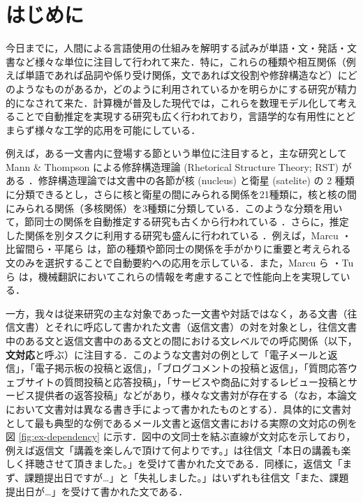 \documentclass[japanese]{jnlp_1.4}
\begin{document}
\maketitle


\section{はじめに}

今日までに，人間による言語使用の仕組みを解明する試みが単語・文・発話・文書など様々な単位に注目して行われて来た．特に，これらの種類や相互関係（例えば単語であれば品詞や係り受け関係，文であれば文役割や修辞構造など）にどのようなものがあるか，どのように利用されているかを明らかにする研究が精力的になされて来た．計算機が普及した現代では，これらを数理モデル化して考えることで自動推定を実現する研究も広く行われており，言語学的な有用性にとどまらず様々な工学的応用を可能にしている．

例えば，ある一文書内に登場する節という単位に注目すると，主な研究として Mann \& Thompson による修辞構造理論 (Rhetorical Structure Theory; RST) がある \cite{Mann1987,Mann1992}．修辞構造理論では文書中の各節が核 (nucleus) と衛星 (satelite) の 2 種類に分類できるとし，さらに核と衛星の間にみられる関係を21種類に，核と核の間にみられる関係（多核関係）を3種類に分類している．このような分類を用いて，節同士の関係を自動推定する研究も古くから行われている \cite{Marcu1997a,田村直良:1998-01-10}．さらに，推定した関係を別タスクに利用する研究も盛んに行われている \cite{Marcu99discoursetrees,比留間正樹:1999-07-10,Marcu2000,平尾:2013,tu-zhou-zong:2013:Short}．例えば，Marcu \citeyear{Marcu99discoursetrees}・比留間ら\citeyear{比留間正樹:1999-07-10}・平尾ら \citeyear{平尾:2013} は，節の種類や節同士の関係を手がかりに重要と考えられる文のみを選択することで自動要約への応用を示している．また，Marcu ら \citeyear{Marcu2000}・Tu ら \citeyear{tu-zhou-zong:2013:Short} は，機械翻訳においてこれらの情報を考慮することで性能向上を実現している．

一方，我々は従来研究の主な対象であった一文書や対話ではなく，ある文書（往信文書）とそれに呼応して書かれた文書（返信文書）の対を対象とし，往信文書中のある文と返信文書中のある文との間における文レベルでの呼応関係（以下，\textbf{文対応}と呼ぶ）に注目する．このような文書対の例として「電子メールと返信」，「電子掲示板の投稿と返信」，「ブログコメントの投稿と返信」，「質問応答ウェブサイトの質問投稿と応答投稿」，「サービスや商品に対するレビュー投稿とサービス提供者の返答投稿」などがあり，様々な文書対が存在する（なお，本論文において文書対は異なる書き手によって書かれたものとする）．具体的に文書対として最も典型的な例であるメール文書と返信文書における実際の文対応の例を図 \ref{fig:ex-dependency} に示す．図中の文同士を結ぶ直線が文対応を示しており，例えば返信文「講義を楽しんで頂けて何よりです。」は往信文「本日の講義も楽しく拝聴させて頂きました。」を受けて書かれた文である．同様に，返信文「まず、課題提出日ですが…」と「失礼しました。」はいずれも往信文「また、課題提出日が…」を受けて書かれた文である．
\end{document}

